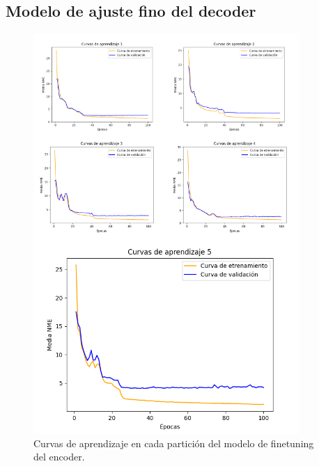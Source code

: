 \subsection*{Modelo de ajuste fino del decoder}
\begin{figure}[H]
    \centering
    \includegraphics[width=0.9\textwidth]{img/curvas_decoder.png}
    \caption{Curvas de aprendizaje en cada partición del modelo de finetuning del encoder.}
    \label{fig:curvas_decoder}
\end{figure}

\newpage
